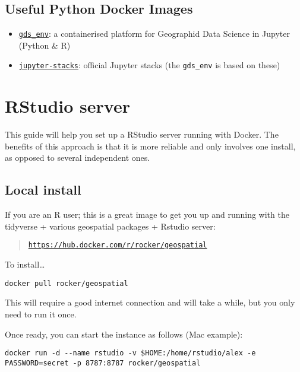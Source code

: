 \documentclass[
]{book}
\providecommand{\tightlist}{%
  \setlength{\itemsep}{0pt}\setlength{\parskip}{0pt}}
\begin{document}
\hypertarget{useful-python-docker-images}{%
\section{Useful Python Docker Images}\label{useful-python-docker-images}}

\begin{itemize}
\tightlist
\item
  \href{https://github.com/darribas/gds_env}{\texttt{gds\_env}}: a containerised platform
  for Geographid Data Science in Jupyter (Python \& R)
\item
  \href{https://github.com/jupyter/docker-stacks}{\texttt{jupyter-stacks}}: official
  Jupyter stacks (the \texttt{gds\_env} is based on these)
\end{itemize}

\hypertarget{rstudio-server}{%
\chapter{RStudio server}\label{rstudio-server}}

This guide will help you set up a RStudio server running with Docker. The
benefits of this approach is that it is more reliable and only involves one
install, as opposed to several independent ones.

\hypertarget{local-install-1}{%
\section{Local install}\label{local-install-1}}

If you are an R user; this is a great image to get you up and running with the tidyverse + various geospatial packages + Rstudio server:

\begin{quote}
\href{https://hub.docker.com/r/rocker/geospatial}{\texttt{https://hub.docker.com/r/rocker/geospatial}}
\end{quote}

To install\ldots{}

\begin{verbatim}
docker pull rocker/geospatial
\end{verbatim}

This will require a good internet connection and will take a while, but you
only need to run it once.

Once ready, you can start the instance as follows (Mac example):

\begin{verbatim}
docker run -d --name rstudio -v $HOME:/home/rstudio/alex -e PASSWORD=secret -p 8787:8787 rocker/geospatial
\end{verbatim}
\end{document}
